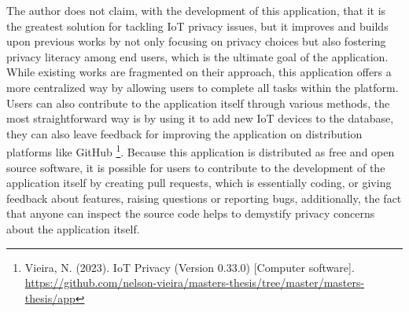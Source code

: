 The author does not claim, with the development of this application, that
it is the greatest solution for tackling IoT privacy issues, but it improves
and builds upon previous works by not only focusing on privacy choices but also
fostering privacy literacy among end users, which is the ultimate goal
of the application. While existing works are fragmented on their approach,
this application offers a more centralized way by allowing users to complete
all tasks within the platform. Users can also contribute to the application itself
through various methods, the most straightforward way is by using it to
add new IoT devices to the database, they can also leave
feedback for improving the application on distribution platforms like
GitHub \footnote{Vieira, N. (2023). IoT Privacy (Version 0.33.0) [Computer software]. \url{https://github.com/nelson-vieira/masters-thesis/tree/master/masters-thesis/app}}.
Because this application is distributed as free and open source software, it
is possible for users to contribute to the development of the
application itself by creating pull requests, which is essentially coding,
or giving feedback about features, raising questions or reporting bugs,
additionally, the fact that anyone can inspect the source code helps
to demystify privacy concerns about the application itself.
